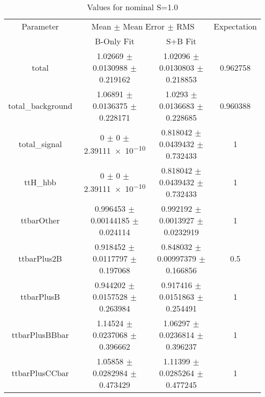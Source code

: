 \begin{table}
\centering
\caption{Values for nominal S=1.0}
\begin{tabular}{cccc}
\toprule
Parameter & \multicolumn{2}{c}{Mean $\pm$ Mean Error $\pm$ RMS} & Expectation\\
 & B-Only Fit & S+B Fit & \\
\midrule
total & \num{1.02669} $\pm$ \num{0.0130988} $\pm$ \num{0.219162} & \num{1.02096} $\pm$ \num{0.0130803} $\pm$ \num{0.218853} & \num{0.962758}\\
total\_background & \num{1.06891} $\pm$ \num{0.0136375} $\pm$ \num{0.228171} & \num{1.0293} $\pm$ \num{0.0136683} $\pm$ \num{0.228685} & \num{0.960388}\\
total\_signal & \num{0} $\pm$ \num{0} $\pm$ \num{2.39111e-10} & \num{0.818042} $\pm$ \num{0.0439432} $\pm$ \num{0.732433} & \num{1}\\
ttH\_hbb & \num{0} $\pm$ \num{0} $\pm$ \num{2.39111e-10} & \num{0.818042} $\pm$ \num{0.0439432} $\pm$ \num{0.732433} & \num{1}\\
ttbarOther & \num{0.996453} $\pm$ \num{0.00144185} $\pm$ \num{0.024114} & \num{0.992192} $\pm$ \num{0.0013927} $\pm$ \num{0.0232919} & \num{1}\\
ttbarPlus2B & \num{0.918452} $\pm$ \num{0.0117797} $\pm$ \num{0.197068} & \num{0.848032} $\pm$ \num{0.00997379} $\pm$ \num{0.166856} & \num{0.5}\\
ttbarPlusB & \num{0.944202} $\pm$ \num{0.0157528} $\pm$ \num{0.263984} & \num{0.917416} $\pm$ \num{0.0151863} $\pm$ \num{0.254491} & \num{1}\\
ttbarPlusBBbar & \num{1.14524} $\pm$ \num{0.0237068} $\pm$ \num{0.396662} & \num{1.06297} $\pm$ \num{0.0236814} $\pm$ \num{0.396237} & \num{1}\\
ttbarPlusCCbar & \num{1.05858} $\pm$ \num{0.0282984} $\pm$ \num{0.473429} & \num{1.11399} $\pm$ \num{0.0285264} $\pm$ \num{0.477245} & \num{1}\\
\bottomrule
\end{tabular}
\end{table}